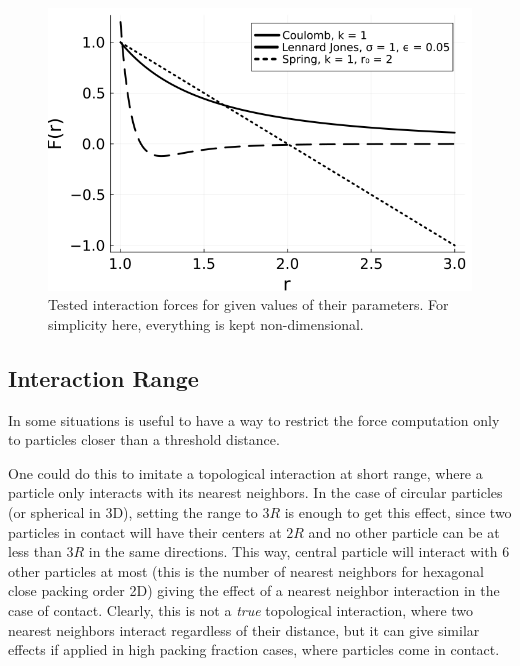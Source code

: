 \documentclass[../../master_thesis_np.tex]{subfiles}
\begin{document}
	\begin{figure}[htp]
		\centering
		\includegraphics[width = \textwidth]{potentials.png}
		\caption{Tested interaction forces for given values of their parameters. For simplicity here, everything is kept non-dimensional.}
		\label{fig:potentials}
	\end{figure}
	
		
	\subsection{Interaction Range} \label{intrange}
	In some situations is useful to have a way to restrict the force computation only to particles closer than a threshold distance.
		
	One could do this to imitate a topological interaction at short range, where a particle only interacts with its nearest neighbors. 
	In the case of circular particles (or spherical in 3D), setting the range to $3R$ is enough to get this effect, since two particles in contact will have their centers at $2R$ and no other particle can be at less than $3R$ in the same directions. 
	This way, central particle will interact with 6 other particles at most (this is the number of nearest neighbors for hexagonal close packing order 2D) giving the effect of a nearest neighbor interaction in the case of contact. 
	Clearly, this is not a \emph{true} topological interaction, where two nearest neighbors interact regardless of their distance, but it can give similar effects if applied in high packing fraction cases, where particles come in contact.
	
\end{document}
